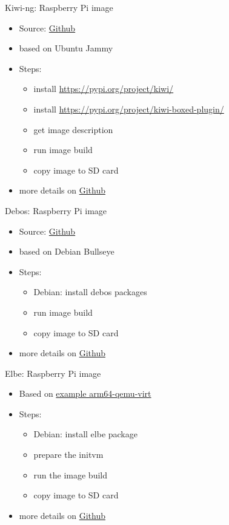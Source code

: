 \documentclass{beamer}
\begin{document}
\begin{frame}{Kiwi-ng: Raspberry Pi image}
	\begin{itemize}
		\item Source: \href{https://github.com/OSInside/kiwi-descriptions/tree/main/ubuntu/aarch64/ubuntu-jammy-rpi}{Github}
		\item based on Ubuntu Jammy
		\item Steps:
		\begin{itemize}
			\item install \url{https://pypi.org/project/kiwi/}
			\item install \url{https://pypi.org/project/kiwi-boxed-plugin/}
			\item get image description
			\item run image build
			\item copy image to SD card
		\end{itemize}
		\item more details on \href{https://github.com/tomirgang/eh21_maintainable_linux/tree/main/examples/first_build_rpi4/kiwi-ng}{Github}
	\end{itemize}
\end{frame}


\begin{frame}{Debos: Raspberry Pi image}
	\begin{itemize}
		\item Source: \href{https://github.com/go-debos/debos-recipes/tree/main/rpi64}{Github}
		\item based on Debian Bullseye
		\item Steps:
		\begin{itemize}
			\item Debian: install debos packages
			\item run image build
			\item copy image to SD card
		\end{itemize}
		\item more details on \href{https://github.com/tomirgang/eh21_maintainable_linux/tree/main/examples/first_build_rpi4/debos}{Github}
	\end{itemize}
\end{frame}


\begin{frame}{Elbe: Raspberry Pi image}
	\begin{itemize}
		\item Based on \href{https://github.com/Linutronix/elbe/blob/master/examples/arm64-qemu-virt.xml}{example arm64-qemu-virt}
		\item Steps:
		\begin{itemize}
			\item Debian: install elbe package
			\item prepare the initvm
			\item run the image build
			\item copy image to SD card
		\end{itemize}
		\item more details on \href{https://github.com/tomirgang/eh21_maintainable_linux/tree/main/examples/first_build_rpi4/elbe}{Github}
	\end{itemize}
\end{frame}
\end{document}

